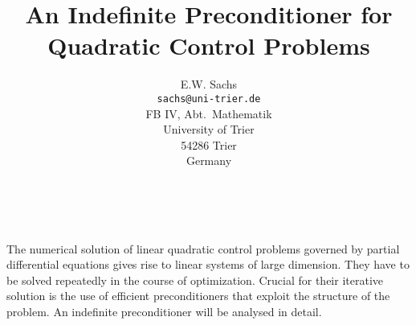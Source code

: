 \documentclass[11pt]{article}
\date{ ~ \hspace{-4mm}}
\title{An Indefinite Preconditioner for Quadratic Control Problems  }
\author{E.W. Sachs \\ {\tt  sachs@uni-trier.de} \\ FB IV, Abt.\ Mathematik \\ University of Trier \\ 54286 Trier \\ Germany}
\begin{document}
\maketitle
\thispagestyle{empty}





 



The numerical solution of linear quadratic control problems 
governed by partial differential equations 
gives rise to linear systems of large dimension.
They have to be solved repeatedly in the course of optimization.
Crucial for their iterative solution 
is the use of efficient preconditioners
that exploit the structure of the problem. 
An indefinite preconditioner will be analysed in detail.
\end{document}
